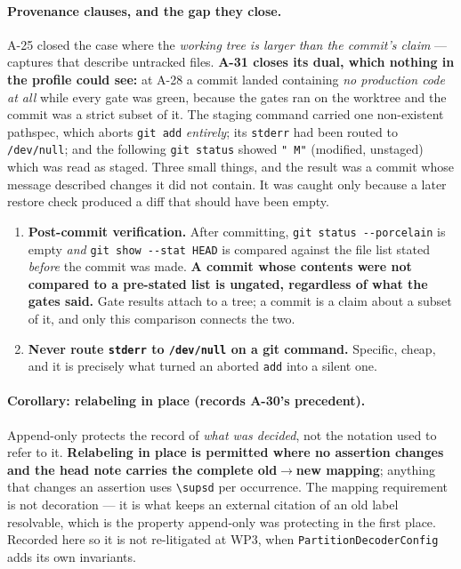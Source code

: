 \documentclass[
  10pt,
]{article}
\providecommand{\tightlist}{%
  \setlength{\itemsep}{0pt}\setlength{\parskip}{0pt}}
\begin{document}
\paragraph{Provenance clauses, and the gap they close.}
A-25 closed the case where the \emph{working tree is larger than the commit's claim} --- captures that describe untracked files. \textbf{A-31 closes its dual, which nothing in the profile could see:} at A-28 a commit landed containing \emph{no production code at all} while every gate was green, because the gates ran on the worktree and the commit was a strict subset of it. The staging command carried one non-existent pathspec, which aborts \texttt{git add} \emph{entirely}; its \texttt{stderr} had been routed to \texttt{/dev/null}; and the following \texttt{git status} showed \texttt{" M"} (modified, unstaged) which was read as staged. Three small things, and the result was a commit whose message described changes it did not contain. It was caught only because a later restore check produced a diff that should have been empty.
\begin{enumerate}
\tightlist
\setcounter{enumi}{4}
\item \textbf{Post-commit verification.} After committing, \texttt{git status -{}-porcelain} is empty \emph{and} \texttt{git show -{}-stat HEAD} is compared against the file list stated \emph{before} the commit was made. \textbf{A commit whose contents were not compared to a pre-stated list is ungated, regardless of what the gates said.} Gate results attach to a tree; a commit is a claim about a subset of it, and only this comparison connects the two.
\item \textbf{Never route \texttt{stderr} to \texttt{/dev/null} on a git command.} Specific, cheap, and it is precisely what turned an aborted \texttt{add} into a silent one.
\end{enumerate}

\paragraph{Corollary: relabeling in place (records A-30's precedent).}
Append-only protects the record of \emph{what was decided}, not the notation used to refer to it. \textbf{Relabeling in place is permitted where no assertion changes and the head note carries the complete old$\rightarrow$new mapping}; anything that changes an assertion uses \texttt{\textbackslash supsd} per occurrence. The mapping requirement is not decoration --- it is what keeps an external citation of an old label resolvable, which is the property append-only was protecting in the first place. Recorded here so it is not re-litigated at WP3, when \texttt{PartitionDecoderConfig} adds its own invariants.
\end{document}
